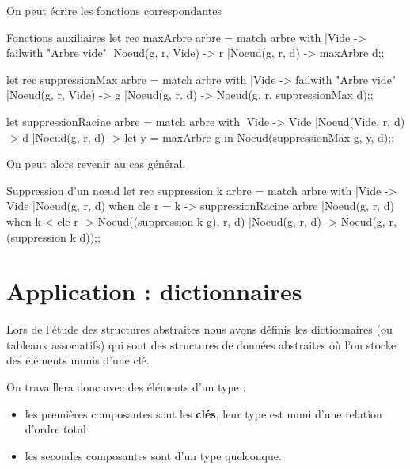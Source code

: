On peut écrire les fonctions correspondantes
\begin{code}{Fonctions auxiliaires}
let rec maxArbre arbre = 
   match arbre with
   |Vide -> failwith "Arbre vide"
   |Noeud(g, r, Vide) -> r
   |Noeud(g, r, d) -> maxArbre d;;

let rec suppressionMax arbre = 
   match arbre with
   |Vide -> failwith "Arbre vide"
   |Noeud(g, r, Vide) -> g
   |Noeud(g, r, d) -> Noeud(g, r, suppressionMax d);;

let suppressionRacine arbre = 
   match arbre with
   |Vide -> Vide
   |Noeud(Vide, r, d) -> d
   |Noeud(g, r, d) ->  let y = maxArbre g in
                       Noeud(suppressionMax g, y, d);;
\end{code}
On peut alors revenir au cas général.

\begin{code}{Suppression d'un nœud}
let rec suppression k arbre = 
   match arbre with
   |Vide -> Vide
   |Noeud(g, r, d) when cle r = k 
                   -> suppressionRacine arbre
   |Noeud(g, r, d) when k < cle r 
                   -> Noeud((suppression k g), r, d)
   |Noeud(g, r, d) -> Noeud(g, r, (suppression k d));;
\end{code}
\section{Application : dictionnaires}

Lors de l'étude des structures abstraites nous avons définis les dictionnaires (ou tableaux associatifs) qui sont des structures de données abstraites où l'on stocke des éléments munis d'une clé.

On travaillera donc  avec des éléments d'un type  :

\begin{itemize}
    \item les premières composantes sont les {\bf clés}, leur type est muni d'une relation d'ordre total
    \item les secondes composantes sont d'un type quelconque.
\end{itemize}


